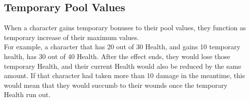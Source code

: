 \subsection{Temporary Pool Values}\label{subsec:temporaryPoolValues}
When a character gains temporary bonuses to their pool values, they function as temporary increase of their maximum values.\\
For example, a character that has 20 out of 30 Health, and gains 10 temporary health, has 30 out of 40 Health.
After the effect ends, they would lose those temporary Health, and their current Health would also be reduced by the same amount.
If that character had taken more than 10 damage in the meantime, this would mean that they would succumb to their wounds once the temporary Health run out.\\